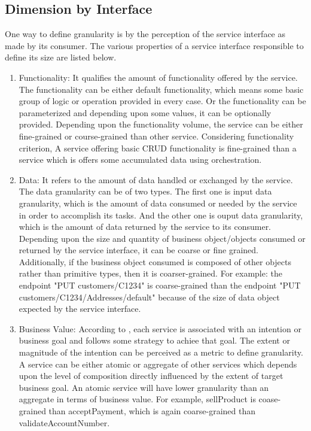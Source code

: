 \subsection{Dimension by Interface}\label{subsection:granularity/dimensions/interface}
One way to define granularity is by the perception of the service interface as made by its consumer. The various properties of a service interface responsible to define its size are listed below.
\begin{enumerate}
\item Functionality: It qualifies the amount of functionality offered by the service. The functionality can be either default functionality, which means some basic group of logic or operation provided in every case. Or the functionality can be parameterized and depending upon some values, it can be optionally provided. Depending upon the functionality volume, the service can be either fine-grained or course-grained than other service. Considering functionality criterion, A service offering basic CRUD functionality is fine-grained than a service which is offers some accumulated data using orchestration. \cite{Raf-Haesen:2015aa}
\\
\item Data: It refers to the amount of data handled or exchanged by the service. The data granularity can be of two types. The first one is input data granularity, which is the amount of data consumed or needed by the service in order to accomplish its tasks. And the other one is ouput data granularity, which is the amount of data returned by the service to its consumer. Depending upon the size and quantity of business object/objects consumed or returned by the service interface, it can be coarse or fine grained. Additionally, if the business object consumed is composed of other objects rather than primitive types, then it is coarser-grained. For example: the endpoint "PUT customers/C1234" is coarse-grained than the endpoint "PUT customers/C1234/Addresses/default" because of the size of data object expected by the service interface. \cite{Raf-Haesen:2015aa}
\\
\item Business Value: According to \cite{Rolland:2015aa}, each service is associated with an intention or business goal and follows some strategy to achiee that goal. The extent or magnitude of the intention can be perceived as a metric to define granularity. A service can be either atomic or aggregate of other services which depends upon the level of composition directly influenced by the extent of target business goal. An atomic service will have lower granularity than an aggregate in terms of business value. For example, sellProduct is coase-grained than acceptPayment, which is again coarse-grained than validateAccountNumber. \cite{Raf-Haesen:2015aa}
\end{enumerate}

